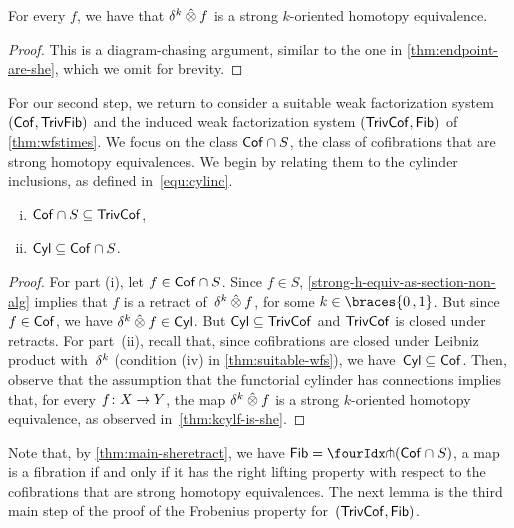 \documentclass[reqno,10pt,a4paper,oneside,draft]{amsart}
\begin{document}
{{\begin{lemma} \label{thm:kcylf-is-she}
For every $f$, we have that $\delta^k \mathbin{\hat{\otimes}} f$ is a strong $k$-oriented homotopy equivalence. 
\end{lemma} 

\begin{proof} This is a  diagram-chasing argument, similar to the one in \cref{thm:endpoint-are-she}, which we omit for brevity.
\end{proof} 

For our second step, we return to consider a suitable weak factorization system $(\mathsf{Cof}, \mathsf{TrivFib})$ and the induced weak factorization system
$(\mathsf{TrivCof}, \mathsf{Fib})$ of  \cref{thm:wfstimes}. We focus on the class $\mathsf{Cof} \cap S$, \ie the class of cofibrations that are strong homotopy equivalences. We begin by relating them to the cylinder inclusions, as defined in~\eqref{equ:cylinc}.

\begin{lemma}  \label{thm:main-sheretract} \hfill 
\begin{enumerate}[(i)] 
\item $\mathsf{Cof} \cap S \subseteq \mathsf{TrivCof}$,
\item $\mathsf{Cyl} \subseteq \mathsf{Cof} \cap S$. 
\end{enumerate}
\end{lemma}

\begin{proof} For part (i), let $f \in  \mathsf{Cof} \cap S$. Since $f \in S$, \cref{strong-h-equiv-as-section-non-alg} implies that $f$ is a retract of~$\delta^k \mathbin{\hat{\otimes}} f$, for some $k \in \braces{0 \, , 1 }$. But since $f \in \mathsf{Cof}$, we have $\delta^k \mathbin{\hat{\otimes}} f \in \mathsf{Cyl}$. But $\mathsf{Cyl} \subseteq \mathsf{TrivCof}$ and $\mathsf{TrivCof}$ is closed under retracts. For part~(ii), recall 
that, since cofibrations are closed under Leibniz product with~$\delta^k$ (condition (iv) in \cref{thm:suitable-wfs}), we have~$\mathsf{Cyl}  \subseteq \mathsf{Cof}$.
Then, observe that the assumption that the functorial cylinder has connections implies that, 
for every $f \colon X \to Y$, the map $\delta^k \mathbin{\hat{\otimes}} f$ is a strong $k$-oriented homotopy equivalence, as observed 
in~\cref{thm:kcylf-is-she}.
\end{proof}

\begin{remark} \label{fib-and-she}
Note that, by \cref{thm:main-sheretract}, we have $\Fib = \liftr{(\Cof \cap S)}$, \ie a map is a fibration if and only if it has the right lifting property with respect to the cofibrations that are strong homotopy equivalences. The next lemma is the third main step of the proof of the Frobenius property for~$(\mathsf{TrivCof}, \mathsf{Fib})$. 
\end{remark} 


}}
\end{document}
